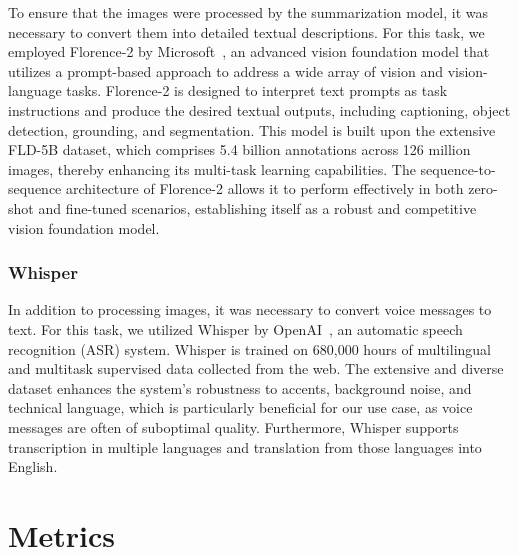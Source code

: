\documentclass[10pt,twocolumn,letterpaper]{article}
\begin{document}
To ensure that the images were processed by the summarization model, it was necessary to convert them into detailed textual descriptions. 
For this task, we employed Florence-2 by Microsoft~\cite{xiao2023florence2advancingunifiedrepresentation}, an advanced vision foundation model that utilizes a prompt-based approach to address a wide array of vision and vision-language tasks. 
Florence-2 is designed to interpret text prompts as task instructions and produce the desired textual outputs, including captioning, object detection, grounding, and segmentation. 
This model is built upon the extensive FLD-5B dataset, which comprises 5.4 billion annotations across 126 million images, thereby enhancing its multi-task learning capabilities. 
The sequence-to-sequence architecture of Florence-2 allows it to perform effectively in both zero-shot and fine-tuned scenarios, establishing itself as a robust and competitive vision foundation model.

\subsubsection{Whisper}

In addition to processing images, it was necessary to convert voice messages to text. 
For this task, we utilized Whisper by OpenAI~\cite{radford2022robustspeechrecognitionlargescale}, an automatic speech recognition (ASR) system. 
Whisper is trained on 680,000 hours of multilingual and multitask supervised data collected from the web. 
The extensive and diverse dataset enhances the system's robustness to accents, background noise, and technical language, which is particularly beneficial for our use case, as voice messages are often of suboptimal quality. 
Furthermore, Whisper supports transcription in multiple languages and translation from those languages into English.

\section{Metrics}
\end{document}
